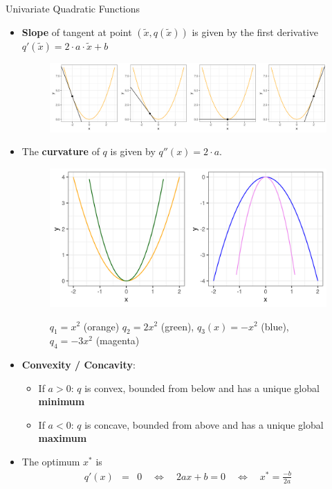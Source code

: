 \begin{vbframe}{Univariate Quadratic Functions}
  \begin{itemize}
    \item \textbf{Slope} of tangent at point $(\tilde x, q(\tilde x))$ is given by the first derivative $q'(\tilde x) = 2 \cdot a \cdot \tilde x + b$
    \begin{figure}
    \includegraphics[height=0.2\textwidth, keepaspectratio]{figure_man/quadratic_functions_1D_derivative.png} \\
    \begin{footnotesize} 
    \end{footnotesize}
    \end{figure}
     \item The \textbf{curvature} of $q$ is given by $q''(x) = 2\cdot a$. 
    \begin{figure}
    \includegraphics[height=0.2\textwidth, keepaspectratio]{figure_man/quadratic_functions_1D_curvature.png} \\
    \begin{footnotesize} 
     $q_1 = x^2$ (orange) $q_2 = 2 x^2$ (green), $q_3 (x) = - x^2$ (blue), $q_4 = - 3 x^2$ (magenta)
    \end{footnotesize}
    \end{figure}
  
    \item \textbf{Convexity / Concavity}: 
  
    \begin{itemize}
      \item If $a > 0$: $q$ is convex, bounded from below and has a unique global \textbf{minimum}
      \item If $a < 0$: $q$ is concave, bounded from above and has a unique global \textbf{maximum}
    \end{itemize}
  
    \item The optimum $x^\ast$ is 
    \begin{eqnarray*}
      q'(x) &=& 0 \quad\Leftrightarrow \quad 2ax + b = 0 \quad \Leftrightarrow \quad x^\ast = \frac{-b}{2a}  	
    \end{eqnarray*}
  \end{itemize}
  

\end{vbframe}
